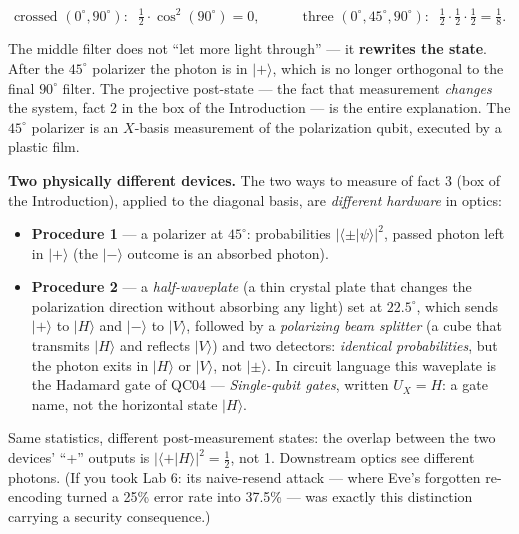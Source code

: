 \documentclass[a4paper,11pt]{article}
\providecommand{\ket}[1]{|#1\rangle}
\providecommand{\braket}[2]{\langle#1|#2\rangle}
\begin{document}
\begin{equation}
    \text{crossed } (0^\circ, 90^\circ):\;\;
    \tfrac12\cdot\cos^2(90^\circ) = 0,
    \qquad\quad
    \text{three } (0^\circ, 45^\circ, 90^\circ):\;\;
    \tfrac12\cdot\tfrac12\cdot\tfrac12 = \tfrac18.
    \label{eq:threepol}
\end{equation}

The middle filter does not ``let more light through'' --- it \textbf{rewrites the
state}. After the $45^\circ$ polarizer the photon is in $\ket{+}$, which is no longer
orthogonal to the final $90^\circ$ filter. The projective post-state --- the fact
that measurement \emph{changes} the system, fact 2 in the box of the Introduction --- is
the entire explanation. The $45^\circ$ polarizer is an $X$-basis measurement of the
polarization qubit, executed by a plastic film.

\begin{procedurebox}
\textbf{Two physically different devices.} The two ways to measure of fact 3 (box of
the Introduction), applied to the diagonal basis, are \emph{different hardware} in
optics:
\begin{itemize}
    \item \textbf{Procedure 1} --- a polarizer at $45^\circ$: probabilities
          $|\braket{\pm}{\psi}|^2$, passed photon left in $\ket{+}$ (the $\ket{-}$
          outcome is an absorbed photon).
    \item \textbf{Procedure 2} --- a \emph{half-waveplate} (a thin crystal plate that
          changes the polarization direction without absorbing any light) set at
          $22.5^\circ$, which sends $\ket{+}$ to $\ket{H}$ and $\ket{-}$ to $\ket{V}$,
          followed by a \emph{polarizing beam splitter} (a cube that transmits $\ket{H}$
          and reflects $\ket{V}$) and two detectors: \emph{identical probabilities}, but
          the photon exits in $\ket{H}$ or $\ket{V}$, not $\ket{\pm}$. In circuit
          language this waveplate is the Hadamard gate of QC04 --- \textit{Single-qubit
          gates}, written $U_X = H$: a gate name, not the horizontal state $\ket{H}$.
\end{itemize}
Same statistics, different post-measurement states: the overlap between the two
devices' ``+'' outputs is $|\braket{+}{H}|^2 = \tfrac12$, not 1. Downstream optics
see different photons. (If you took Lab 6: its naive-resend attack --- where Eve's
forgotten re-encoding turned a 25\% error rate into 37.5\% --- was exactly this
distinction carrying a security consequence.)
\end{procedurebox}
\end{document}
